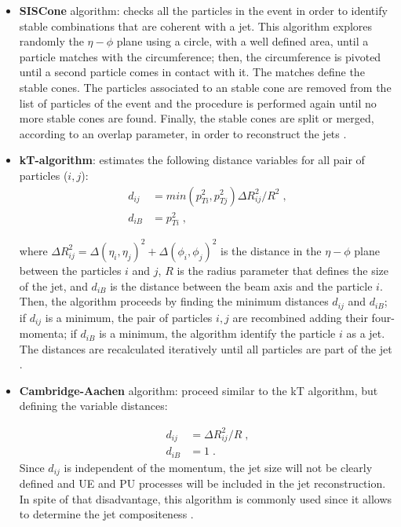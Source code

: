 \begin{itemize}
 \item \textbf{SISCone} algorithm: checks all the particles in the event in order to 
 identify stable combinations that are coherent with a jet. This algorithm explores randomly the $\eta-\phi$ plane
 using a circle, with a well defined area, until a particle matches with the circumference; then, the circumference
 is pivoted until a second particle comes in contact with it. The matches define the stable cones. The particles
 associated to an stable cone are removed from the list of particles of the event and the procedure is performed again 
 until no more stable cones are found. Finally, the stable cones are split or merged, according to an overlap parameter, in order to 
 reconstruct the jets \cite{ICRJet}. 
 
 
 \item \textbf{kT-algorithm}: estimates the following distance variables for all pair of particles ($i,j$):
\begin{equation} \label{eq:kt}  
 \begin{aligned}
  d_{ij} &= min(p_{Ti}^{2},p_{Tj}^{2})\Delta R_{ij}^{2}/R^{2} \;,\\
  d_{iB} &= p_{Ti}^{2} \;,
  \end{aligned}
  \end{equation}

\noindent where $\Delta R_{ij}^{2}=\Delta(\eta_{i},\eta_{j})^{2}+\Delta(\phi_{i},\phi_{j})^{2}$ is the distance 
in the $\eta-\phi$ plane between the particles $i$ and $j$, $R$ is the radius parameter that 
defines the size of the jet, and $d_{iB}$ is the distance between the beam axis and the particle $i$. Then, the algorithm
proceeds by finding the minimum distances $d_{ij}$ and $d_{iB}$; if $d_{ij}$ is a minimum, the pair 
of particles $i,j$ are recombined adding their four-momenta; if $d_{iB}$ is a minimum, the algorithm
identify the particle $i$ as a jet. The distances are recalculated iteratively until all particles are  %
part of the jet \cite{ktalgorithm, ICRJet}. 
 
\item \textbf{Cambridge-Aachen} algorithm: proceed similar to the kT algorithm, but defining 
 the variable distances:

 \begin{equation}   \label{eq:Cambridge-Aachen}
 \begin{aligned}
  d_{ij} &= \Delta R_{ij}^{2}/R \;,\\
  d_{iB} &= 1 \;.
  \end{aligned}
  \end{equation}
\noindent Since $d_{ij}$ is independent of the momentum, the jet size will not 
be clearly defined and UE and PU processes will be included in the jet reconstruction. In spite of 
that disadvantage, this algorithm is commonly used since it allows to determine the 
jet compositeness \cite{Cambrigdealgorithm}.
 

\end{itemize}
